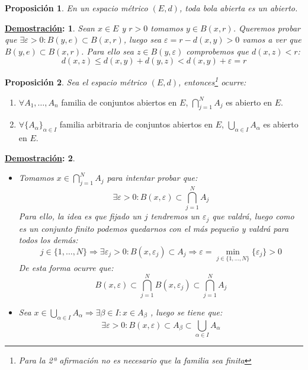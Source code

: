 \documentclass[10pt,a4paper,openright]{book}
\theoremstyle{break}
\newtheorem*{prop}{Proposición}
\newtheorem*{demo}{\underline{Demostración}:}
\begin{document}
\begin{prop}
En un espacio métrico $(E,d)$, toda bola abierta es un abierto.
\end{prop}

\begin{demo}
Sean $x \in E$ y $r>0$ tomamos $y \in B(x,r)$. Queremos probar que $\exists \varepsilon > 0 : B(y,e) \subset B(x,r)$, luego sea $\varepsilon = r - d(x,y) > 0$ vamos a ver que $B(y,e) \subset B(x,r)$. Para ello sea $z \in B(y, \varepsilon)$ comprobemos que $d(x,z) < r$:
$$d(x,z) \leq d(x,y) + d(y,z) < d(x,y) + \varepsilon = r$$
\end{demo}

\begin{prop}
Sea el espacio métrico $(E,d)$, entonces\footnote{Para la 2ª afirmación no es necesario que la familia sea finita} ocurre:
\end{prop}
\begin{enumerate}
\item $\forall A_1, \ldots, A_n$ familia de conjuntos abiertos en $E$, $\displaystyle\bigcap_{j=1}^N A_j$ es abierto en $E$.

\item $\forall \{A_\alpha\}_{\alpha \in I}$ familia arbitraria de conjuntos abiertos en $E$, $\displaystyle \bigcup_{\alpha \in I} A_\alpha$ es abierto en $E$.
\end{enumerate}

\begin{demo}
\begin{itemize}
\item Tomamos $x \in \displaystyle\bigcap_{j=1}^N A_j$ para intentar probar que:
$$\exists \varepsilon > 0 : B(x,\varepsilon) \subset \bigcap_{j=1}^N A_j$$
Para ello, la idea es que fijado un $j$ tendremos un $\varepsilon_j$ que valdrá, luego como es un conjunto finito podemos quedarnos con el más pequeño y valdrá para todos los demás:
$$j \in \{1, \ldots , N\} \Rightarrow \exists \varepsilon_j > 0 : B(x,\varepsilon_j) \subset A_j \Rightarrow \varepsilon = \underset{j \in \{1, \ldots , N\}}{\min}\{\varepsilon_j\} > 0$$
De esta forma ocurre que:
$$B(x,\varepsilon) \subset \bigcap_{j=1}^N B(x,\varepsilon_j)\subset  \bigcap_{j=1}^N A_j$$
\item Sea $x \in \displaystyle\bigcup_{\alpha \in I} A_\alpha \Rightarrow \exists \beta \in I : x \in A_\beta $ , luego se tiene que:
$$\exists \varepsilon > 0 : B(x, \varepsilon) \subset A_\beta \subset \bigcup_{\alpha \in I} A_\alpha$$
\end{itemize}
\end{demo}
\end{document}
